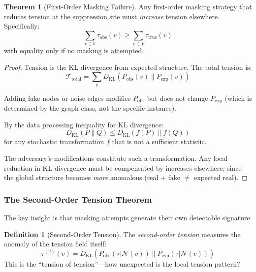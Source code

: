 \documentclass[12pt,a4paper]{article}
\theoremstyle{definition}
\newtheorem{definition}{Definition}[section]
\newtheorem{theorem}{Theorem}[section]
\theoremstyle{remark}
\begin{document}
\begin{theorem}[First-Order Masking Failure]
\label{thm:masking-fail}
Any first-order masking strategy that reduces tension at the suppression site must \emph{increase} tension elsewhere. Specifically:
\begin{equation}
    \boxed{
    \sum_{v \in V} \tau_{\text{obs}}(v) \geq \sum_{v \in V} \tau_{\text{true}}(v)
    }
\end{equation}
with equality only if no masking is attempted.
\end{theorem}

\begin{proof}
Tension is the KL divergence from expected structure. The total tension is:
\begin{equation}
    \mathcal{T}_{\text{total}} = \sum_v D_{\text{KL}}(P_{\text{obs}}(v) \| P_{\text{exp}}(v))
\end{equation}

Adding fake nodes or noise edges modifies $P_{\text{obs}}$ but does not change $P_{\text{exp}}$ (which is determined by the graph class, not the specific instance).

By the data processing inequality for KL divergence:
\begin{equation}
    D_{\text{KL}}(P \| Q) \leq D_{\text{KL}}(f(P) \| f(Q))
\end{equation}
for any stochastic transformation $f$ that is not a sufficient statistic.

The adversary's modifications constitute such a transformation. Any local reduction in KL divergence must be compensated by increases elsewhere, since the global structure becomes \emph{more} anomalous (real + fake $\neq$ expected real).
\end{proof}

\subsubsection{The Second-Order Tension Theorem}

The key insight is that masking attempts generate their own detectable signature.

\begin{definition}[Second-Order Tension]
The \emph{second-order tension} measures the anomaly of the tension field itself:
\begin{equation}
    \tau^{(2)}(v) = D_{\text{KL}}\left( P_{\text{obs}}(\tau | \mathcal{N}(v)) \| P_{\text{exp}}(\tau | \mathcal{N}(v)) \right)
\end{equation}
This is the ``tension of tension''—how unexpected is the local tension pattern?
\end{definition}
\end{document}
